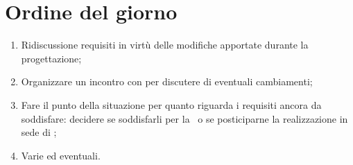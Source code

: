 \documentclass[../AnalisiDeiRequisiti.tex]{subfiles}
\begin{document}
	\section*{Ordine del giorno}
		\begin{enumerate}
			\item Ridiscussione requisiti in virtù delle modifiche apportate durante la progettazione;
			\item Organizzare un incontro con \proponente per discutere di eventuali cambiamenti;
			\item Fare il punto della situazione per quanto riguarda i requisiti ancora da soddisfare: decidere se soddisfarli per la \revisionediqualifica\ o se posticiparne la realizzazione in sede di \revisionediaccettazione;
			\item Varie ed eventuali.
		\end{enumerate}
\end{document}
